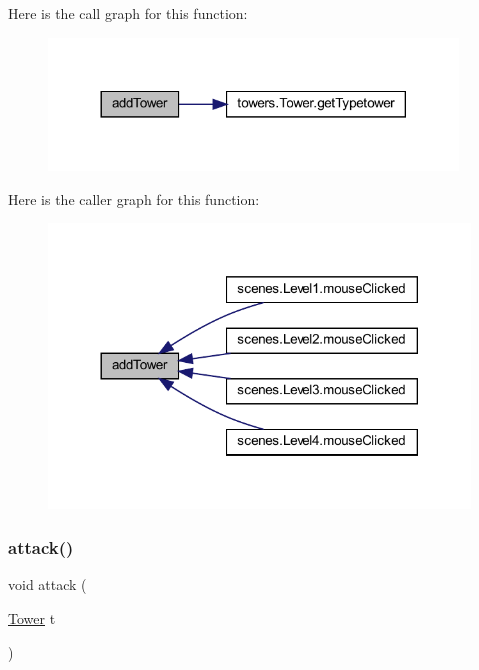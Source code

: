 Here is the call graph for this function\+:\nopagebreak
\begin{figure}[H]
\begin{center}
\leavevmode
\includegraphics[width=308pt]{classmanagers_1_1_tower_manager_a245f3270a9250216ec446114a8cdd805_cgraph}
\end{center}
\end{figure}
Here is the caller graph for this function\+:\nopagebreak
\begin{figure}[H]
\begin{center}
\leavevmode
\includegraphics[width=317pt]{classmanagers_1_1_tower_manager_a245f3270a9250216ec446114a8cdd805_icgraph}
\end{center}
\end{figure}
\mbox{\label{classmanagers_1_1_tower_manager_a337d987717311ab51a124a11a059f66c}} 
\subsubsection{\texorpdfstring{attack()}{attack()}}
{\footnotesize\ttfamily void attack (\begin{DoxyParamCaption}\item[{\hyperlink{classtowers_1_1_tower}{Tower}}]{t }\end{DoxyParamCaption})}



